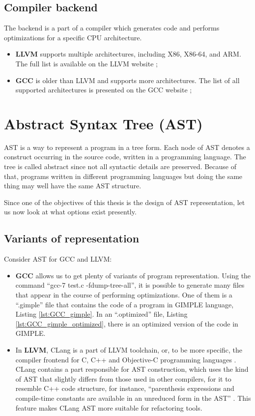 \subsection{Compiler backend}
The backend is a part of a compiler which generates code and performs optimizations for a specific CPU architecture.

\begin{itemize}
    \item \textbf{LLVM} supports multiple architectures, including X86, X86-64, and ARM. The full list is available on the LLVM website \cite{LLVM_features};
    \item \textbf{GCC} is older than LLVM and supports more architectures. The list of all supported architectures is presented on the GCC website \cite{GCCback};
\end{itemize}


\section{Abstract Syntax Tree (AST)}
AST is a way to represent a program in a tree form. Each node of AST denotes a construct occurring in the source code, written in a programming language. The tree is called abstract since not all syntactic details are preserved. Because of that, programs written in different programming languages but doing the same thing may well have the same AST structure.

Since one of the objectives of this thesis is the design of AST representation, let us now look at what options exist presently.

\subsection{Variants of representation}

Consider AST for GCC and LLVM:
\begin{itemize}
    \item \textbf{GCC} allows us to get plenty of variants of program representation. Using the command ``gcc-7 test.c -fdump-tree-all'', it is possible to generate many files that appear in the course of performing optimizations. One of them is a ``.gimple'' file that contains the code of a program in GIMPLE language, Listing \ref{lst:GCC_gimple}. In an ``.optimized'' file, Listing \ref{lst:GCC_gimple_optimized}, there is an optimized version of the code in GIMPLE.

    \item In \textbf{LLVM}, CLang is a part of LLVM toolchain, or, to be more specific, the compiler frontend for C, C++ and Objective-C programming languages \cite{CLangDoc}. 
    CLang contains a part responsible for AST construction, which uses the kind of AST that slightly differs from those used in other compilers, for it to resemble C++ code structure, for instance, ``parenthesis expressions and compile-time constants are available in an unreduced form in the AST'' \cite{CLangAST}.
    This feature makes CLang AST more suitable for refactoring tools.
\end{itemize}


